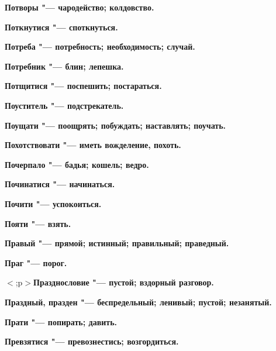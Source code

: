 \bfseries Потворы \normalfont{} "--- чародейство; колдовство. 




\bfseries Поткнутися \normalfont{} "--- споткнуться. 




\bfseries Потреба \normalfont{} "--- потребность; необходимость; случай. 




\bfseries Потребник \normalfont{} "--- блин; лепешка. 




\bfseries Потщитися \normalfont{} "--- поспешить; постараться. 




\bfseries Поуститель \normalfont{} "--- подстрекатель. 




\bfseries Поущати \normalfont{} "--- поощрять; побуждать; наставлять; поучать. 




\bfseries Похотствовати \normalfont{} "--- иметь вожделение, похоть. 




\bfseries Почерпало \normalfont{} "--- бадья; кошель; ведро. 




\bfseries Починатися \normalfont{} "--- начинаться. 




\bfseries Почити \normalfont{} "--- успокоиться. 




\bfseries Пояти \normalfont{} "--- взять. 




\bfseries Правый \normalfont{} "--- прямой; истинный; правильный; праведный. 




\bfseries Праг \normalfont{} "--- порог. 

$<$;p$>$\bfseries Празднословие \normalfont{} "--- пустой; вздорный разговор. 



\bfseries Праздный, празден \normalfont{} "--- беспредельный; ленивый; пустой; незанятый. 




\bfseries Прати \normalfont{} "--- попирать; давить. 




\bfseries Превзятися \normalfont{} "--- превознестись; возгордиться. 




